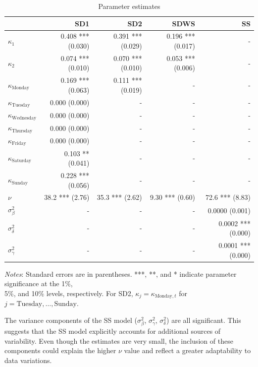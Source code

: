 \begin{table}[t!]
\centering
\begin{threeparttable}
\caption{Parameter estimates}
\centering
\renewcommand{\arraystretch}{1.5}
\begin{tabular}[h]{l r r r r } 
\hline
 & \textbf{SD1} & \textbf{SD2} & \textbf{SDWS} & \textbf{SS} \\
 \hline
 $\kappa_1$ & 0.408 *** (0.030) & 0.391 *** (0.029) & 0.196 *** (0.017) & -\\
 $\kappa_2$ & 0.074 *** (0.010) & 0.070 *** (0.010) & 0.053 *** (0.006) & -\\
 $\kappa_{\text{Monday}}$ & 0.169 *** (0.063) & 0.111 *** (0.019) & - & -\\
 $\kappa_{\text{Tuesday}}$ & 0.000 (0.000) & - & - & -\\
 $\kappa_{\text{Wednesday}}$ & 0.000 (0.000) & - & - & -\\
 $\kappa_{\text{Thursday}}$ & 0.000 (0.000) & - & - & -\\
 $\kappa_{\text{Friday}}$ & 0.000 (0.000) & - & - & - \\
 $\kappa_{\text{Saturday}}$ & 0.103 ** (0.041) & - & - & - \\
 $\kappa_{\text{Sunday}}$ & 0.228 *** (0.056) & - & - & -\\
 $\nu$ & 38.2 *** (2.76) & 35.3 *** (2.62) & 9.30 *** (0.60) & 72.6 *** (8.83)\\
 $\sigma^2_{\beta}$ & - & - & - & 0.0000 (0.001)\\
 $\sigma^2_{\delta}$ & - & - & - & 0.0002 *** (0.000)\\
 $\sigma^2_{\gamma}$ & - & - & - & 0.0001 *** (0.000)\\
\hline
\end{tabular}
\label{tab:parameters}
\begin{tablenotes}
\footnotesize
\item \textit{Notes}:  Standard errors are in parentheses. ***, **, and * indicate parameter significance at the 1\%, \\ \hspace{2em} 5\%, and 10\% levels, respectively. For SD2, $\kappa_j = \kappa_{\text{Monday},t}$ for $j = \text{Tuesday}, \dots , \text{Sunday}$. 
\end{tablenotes}
\end{threeparttable}

\end{table}

The variance components of the SS model ($\sigma^2_{\beta}$, $\sigma^2_{\gamma}$, $\sigma^2_{\delta}$) are all significant. This suggests that the SS model explicitly accounts for additional sources of variability. Even though the estimates are very small, the inclusion of these components could explain the higher $\nu$ value and reflect a greater adaptability to data variations. \\


